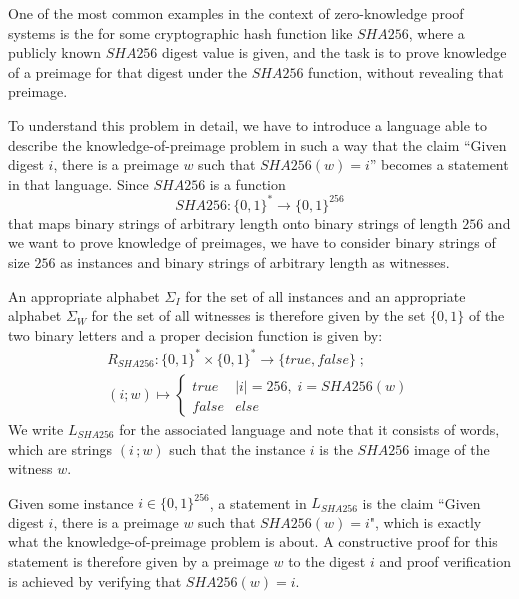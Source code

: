 \begin{example} One of the most common examples in the context of zero-knowledge proof systems is the  for some cryptographic hash function like $SHA256$, where a publicly known $SHA256$ digest value is given, and the task is to prove knowledge of a preimage for that digest under the $SHA256$ function, without revealing that preimage. 

To understand this problem in detail, we have to introduce a language able to describe the knowledge-of-preimage problem in such a way that the claim ``Given digest $i$, there is a preimage $w$ such that $SHA256(w)=i$'' becomes a statement in that language. Since $SHA256$ is a function
$$
SHA256: \{0,1\}^* \to \{0,1\}^{256}
$$
that maps binary strings of arbitrary length onto binary strings of length $256$ and we want to prove knowledge of preimages, we have to consider binary strings of size $256$ as instances and binary strings of arbitrary length as witnesses. 

An appropriate alphabet $\Sigma_I$ for the set of all instances and an appropriate alphabet $\Sigma_W$ for the set of all witnesses is therefore given by the set $\{0,1\}$ of the two binary letters and a proper decision function is given by:
\begin{multline*}
R_{SHA256} : \{0,1\}^* \times \{0,1\}^* \to \{true, false\}\;;\;\\
(i;w) \mapsto
\begin{cases}
true & |i|=256,\; i = SHA256(w)\\
false & else
\end{cases}
\end{multline*}
We write $L_{SHA256}$ for the associated language and note that it consists of words, which are strings $(i\,;w)$ such that the instance $i$ is the $SHA256$ image of the witness $w$. 

Given some instance $i\in \{0,1\}^{256}$, a statement in $L_{SHA256}$ is the claim ``Given digest $i$, there is a preimage $w$ such that $SHA256(w)=i$", which is exactly what the knowledge-of-preimage problem is about. A constructive proof for this statement is therefore given by a preimage $w$ to the digest $i$ and proof verification is achieved by verifying that $SHA256(w)=i$. 
\end{example}
